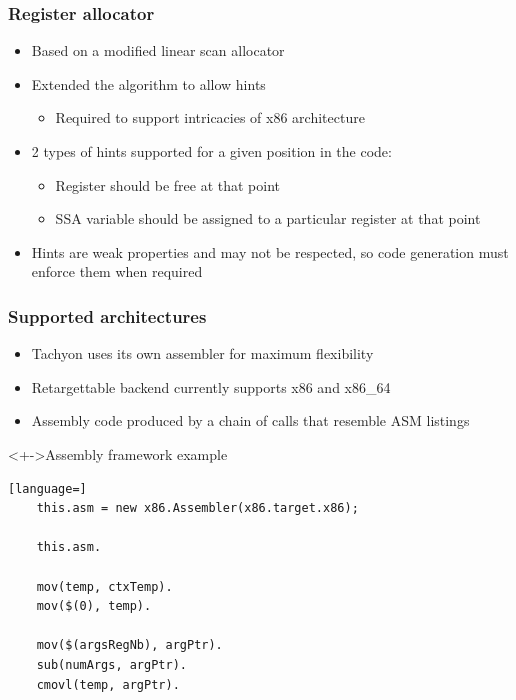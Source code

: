 \begin{frame}
\frametitle{\bf Register allocator}

\begin{itemize}
    \item Based on a modified linear scan allocator
    \item Extended the algorithm to allow hints
    \begin{itemize}
        \item Required to support intricacies of x86 architecture
    \end{itemize}
    \item 2 types of hints supported for a given position in the code:
    \begin{itemize}
        \item Register should be free at that point
        \item SSA variable should be assigned to a particular register at that point
    \end{itemize}
    \item Hints are weak properties and may not be respected, so code generation must enforce
    them when required
\end{itemize}
\end{frame}

\begin{frame}[fragile]
\frametitle{\bf Supported architectures}

\begin{itemize}
    \item Tachyon uses its own assembler for maximum flexibility
    \item Retargettable backend currently supports x86 and x86\_64
    \item Assembly code produced by a chain of calls that resemble ASM
    listings
\end{itemize}

\begin{block}<+->{Assembly framework example}
\begin{lstlisting}[language=]
    this.asm = new x86.Assembler(x86.target.x86);

    this.asm.

    mov(temp, ctxTemp).
    mov($(0), temp).
    
    mov($(argsRegNb), argPtr).
    sub(numArgs, argPtr).
    cmovl(temp, argPtr).
\end{lstlisting}
\end{block}
\end{frame}

